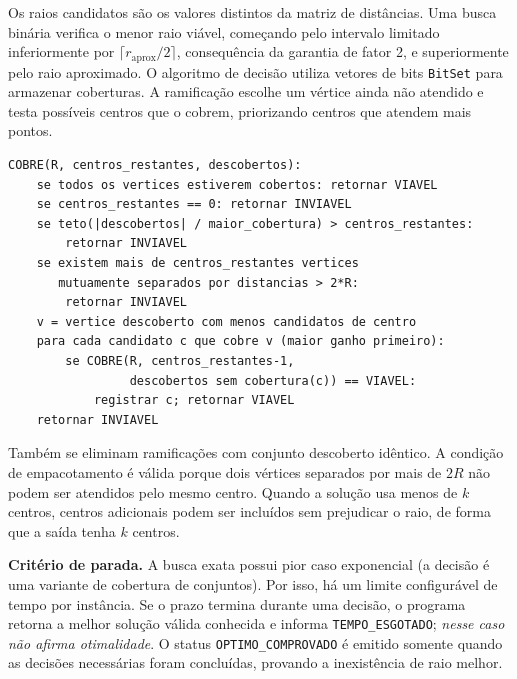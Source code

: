\documentclass[12pt,a4paper]{article}
\begin{document}
Os raios candidatos são os valores distintos da matriz de distâncias.
Uma busca binária verifica o menor raio viável, começando pelo intervalo
limitado inferiormente por $\lceil r_{\mathrm{aprox}}/2\rceil$, consequência
da garantia de fator 2, e superiormente pelo raio aproximado.
O algoritmo de decisão utiliza vetores de bits \texttt{BitSet} para armazenar
coberturas. A ramificação escolhe um vértice ainda não atendido e testa
possíveis centros que o cobrem, priorizando centros que atendem mais pontos.

\begin{lstlisting}[caption={Decisao exata para raio R.}]
COBRE(R, centros_restantes, descobertos):
    se todos os vertices estiverem cobertos: retornar VIAVEL
    se centros_restantes == 0: retornar INVIAVEL
    se teto(|descobertos| / maior_cobertura) > centros_restantes:
        retornar INVIAVEL
    se existem mais de centros_restantes vertices
       mutuamente separados por distancias > 2*R:
        retornar INVIAVEL
    v = vertice descoberto com menos candidatos de centro
    para cada candidato c que cobre v (maior ganho primeiro):
        se COBRE(R, centros_restantes-1,
                 descobertos sem cobertura(c)) == VIAVEL:
            registrar c; retornar VIAVEL
    retornar INVIAVEL
\end{lstlisting}

Também se eliminam ramificações com conjunto descoberto idêntico.
A condição de empacotamento é válida porque dois vértices separados por
mais de $2R$ não podem ser atendidos pelo mesmo centro. Quando a solução
usa menos de $k$ centros, centros adicionais podem ser incluídos sem
prejudicar o raio, de forma que a saída tenha $k$ centros.

\noindent\textbf{Critério de parada.}
A busca exata possui pior caso exponencial (a decisão é uma variante
de cobertura de conjuntos). Por isso, há um limite configurável de tempo
por instância. Se o prazo termina durante uma decisão, o programa retorna
a melhor solução válida conhecida e informa \texttt{TEMPO\_ESGOTADO};
\emph{nesse caso não afirma otimalidade}. O status
\texttt{OPTIMO\_COMPROVADO} é emitido somente quando as decisões necessárias
foram concluídas, provando a inexistência de raio melhor.
\end{document}
